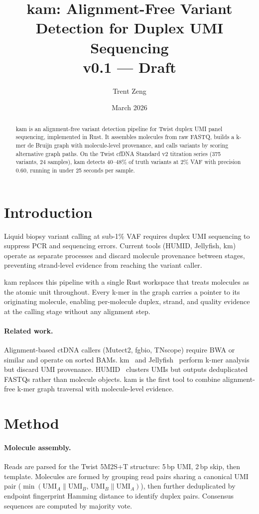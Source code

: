 \documentclass[10pt, twocolumn]{article}
\title{\textbf{kam}: Alignment-Free Variant Detection for Duplex UMI Sequencing\\
\normalsize v0.1 --- Draft}
\author{Trent Zeng}
\date{March 2026}
\begin{document}
\maketitle

\begin{abstract}
kam is an alignment-free variant detection pipeline for Twist duplex UMI panel
sequencing, implemented in Rust. It assembles molecules from raw FASTQ, builds
a k-mer de Bruijn graph with molecule-level provenance, and calls variants by
scoring alternative graph paths. On the Twist cfDNA Standard v2 titration series
(375 variants, 24 samples), kam detects 40--48\% of truth variants at 2\% VAF
with precision 0.60, running in under 25 seconds per sample.
\end{abstract}

\section{Introduction}

Liquid biopsy variant calling at sub-1\% VAF requires duplex UMI sequencing to
suppress PCR and sequencing errors. Current tools (HUMID, Jellyfish, km) operate
as separate processes and discard molecule provenance between stages, preventing
strand-level evidence from reaching the variant caller.

kam replaces this pipeline with a single Rust workspace that treats molecules as
the atomic unit throughout. Every k-mer in the graph carries a pointer to its
originating molecule, enabling per-molecule duplex, strand, and quality evidence
at the calling stage without any alignment step.

\paragraph{Related work.}
Alignment-based ctDNA callers (Mutect2, fgbio, TNscope) require BWA or similar
and operate on sorted BAMs. km~\autocite{Bourgey19km} and
Jellyfish~\autocite{Marcais11jellyfish} perform k-mer analysis but discard
UMI provenance. HUMID~\autocite{Langedijk22humid} clusters UMIs but outputs
deduplicated FASTQs rather than molecule objects. kam is the first tool to combine
alignment-free k-mer graph traversal with molecule-level evidence.

\section{Method}

\paragraph{Molecule assembly.}
Reads are parsed for the Twist 5M2S+T structure: 5\,bp UMI, 2\,bp skip, then
template. Molecules are formed by grouping read pairs sharing a canonical UMI
pair ($\min(\mathrm{UMI}_A\|\mathrm{UMI}_B,\,\mathrm{UMI}_B\|\mathrm{UMI}_A)$),
then further deduplicated by endpoint fingerprint Hamming distance to
identify duplex pairs. Consensus sequences are computed by majority vote.
\end{document}
